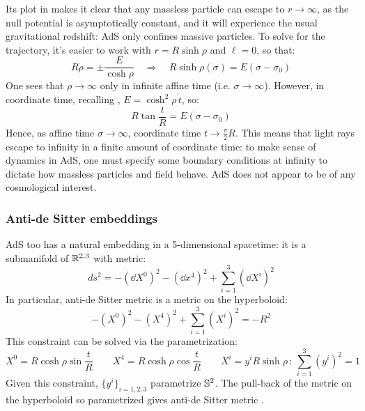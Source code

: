 Its plot in  makes it clear that any massless particle can escape to $ r \rightarrow \infty $, as the null potential is asymptotically constant, and it will experience the usual gravitational redshift: AdS only confines massive particles.
To solve for the trajectory, it's easier to work with $ r = R \sinh \rho $ and $ \ell = 0 $, so that:
\begin{equation*}
  R \dot{\rho} = \pm \frac{E}{\cosh \rho}
  \quad \Rightarrow \quad
  R \sinh \rho(\sigma) = E (\sigma - \sigma_0)
\end{equation*}
One sees that $ \rho \rightarrow \infty $ only in infinite affine time (i.e. $ \sigma \rightarrow \infty $). However, in coordinate time, recalling , $ E = \cosh^2 \rho\, \dot{t} $, so:
\begin{equation*}
  R \tan \frac{t}{R} = E (\sigma - \sigma_0)
\end{equation*}
Hence, as affine time $ \sigma \rightarrow \infty $, coordinate time $ t \rightarrow \frac{\pi}{2} R $. This means that light rays escape to infinity in a finite amount of coordinate time: to make sense of dynamics in AdS, one must specify some boundary conditions at infinity to dictate how massless particles and field behave.
AdS does not appear to be of any cosmological interest.

\subsubsection{Anti-de Sitter embeddings}

AdS too has a natural embedding in a 5-dimensional spacetime: it is a submanifold of $ \mathbb{R}^{2,3} $ with metric:
\begin{equation}
  ds^2 = - (\dd X^0)^2 - (\dd x^4)^2 + \sum_{i = 1}^{3} (\dd X^i)^2
  \label{eq:ads-param-metric}
\end{equation}
In particular, anti-de Sitter metric  is a metric on the hyperboloid:
\begin{equation}
  - (X^0)^2 - (X^4)^2 + \sum_{i = 1}^{3} (X^i)^2 = - R^2
  \label{eq:ads-param}
\end{equation}
This constraint can be solved via the parametrization:
\begin{equation*}
  X^0 = R \cosh \rho \sin \frac{t}{R}
  \qquad
  X^4 = R \cosh \rho \cos \frac{t}{R}
  \qquad
  X^i = y^i R \sinh \rho
  \,:\,
  \sum_{i = 1}^{3} (y^i)^2 = 1
\end{equation*}
Given this constraint, $ \{y^i\}_{i = 1,2,3} $ parametrize $ \mathbb{S}^{2} $. The pull-back of the metric  on the hyperboloid so parametrized gives anti-de Sitter metric .

